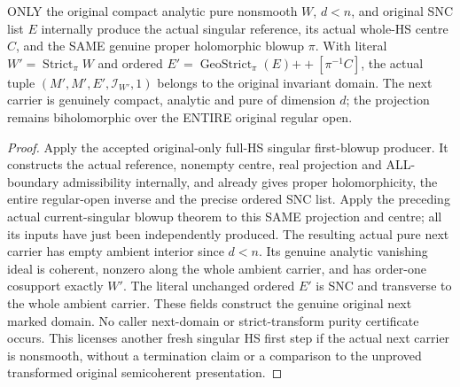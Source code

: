 \begin{theorem}
\label{hir:actual-hs-singular-first-blowup-genuine-next-input}
\leanok
ONLY the original compact analytic pure nonsmooth $W$, $d<n$, and original SNC
list $E$ internally produce the actual singular reference, its actual whole-HS
centre $C$, and the SAME genuine proper holomorphic blowup $\pi$. With literal
$W'=\operatorname{Strict}_\pi W$ and ordered
$E'=\operatorname{GeoStrict}_\pi(E)\mathbin{+\!+}[\pi^{-1}C]$, the actual
tuple $(M',M',E',\mathcal I_{W'},1)$ belongs to the original invariant domain.
The next carrier is genuinely compact, analytic and pure of dimension $d$;
the projection remains biholomorphic over the ENTIRE original regular open.
\end{theorem}
\begin{proof}
Apply the accepted original-only full-HS singular first-blowup producer.
It constructs the actual reference, nonempty centre, real projection and
ALL-boundary admissibility internally, and already gives proper holomorphicity,
the entire regular-open inverse and the precise ordered SNC list. Apply the
preceding actual current-singular blowup theorem to this SAME projection and
centre; all its inputs have just been independently produced. The resulting
actual pure next carrier has empty ambient interior since $d<n$. Its genuine
analytic vanishing ideal is coherent, nonzero along the whole ambient carrier,
and has order-one cosupport exactly $W'$. The literal unchanged ordered $E'$
is SNC and transverse to the whole ambient carrier. These fields construct the
genuine original next marked domain. No caller next-domain or strict-transform
purity certificate occurs. This licenses another fresh singular HS first step
if the actual next carrier is nonsmooth, without a termination claim or a
comparison to the unproved transformed original semicoherent presentation.
\end{proof}
